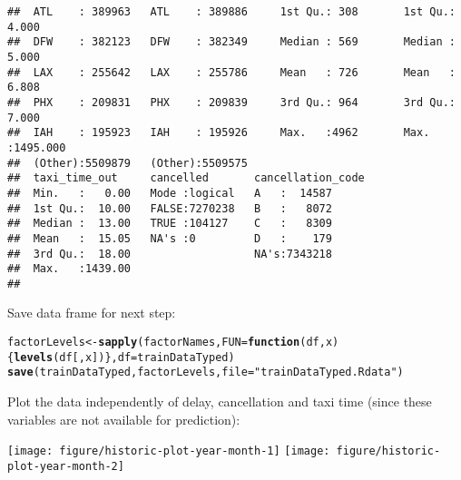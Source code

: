 \documentclass{article}\usepackage[]{graphicx}\usepackage[]{color}
\makeatletter
\newcommand{\hlstr}[1]{\textcolor[rgb]{0.192,0.494,0.8}{#1}}%
\newcommand{\hlstd}[1]{\textcolor[rgb]{0.345,0.345,0.345}{#1}}%
\newcommand{\hlkwa}[1]{\textcolor[rgb]{0.161,0.373,0.58}{\textbf{#1}}}%
\newcommand{\hlkwb}[1]{\textcolor[rgb]{0.69,0.353,0.396}{#1}}%
\newcommand{\hlkwc}[1]{\textcolor[rgb]{0.333,0.667,0.333}{#1}}%
\newcommand{\hlkwd}[1]{\textcolor[rgb]{0.737,0.353,0.396}{\textbf{#1}}}%
\newenvironment{kframe}{%
 \def\at@end@of@kframe{}%
 \ifinner\ifhmode%
  \def\at@end@of@kframe{\end{minipage}}%
  \begin{minipage}{\columnwidth}%
 \fi\fi%
 \def\FrameCommand##1{\hskip\@totalleftmargin \hskip-\fboxsep
 \colorbox{shadecolor}{##1}\hskip-\fboxsep
     \hskip-\linewidth \hskip-\@totalleftmargin \hskip\columnwidth}%
 \MakeFramed {\advance\hsize-\width
   \@totalleftmargin\z@ \linewidth\hsize
   \@setminipage}}%
 {\par\unskip\endMakeFramed%
 \at@end@of@kframe}
\newenvironment{knitrout}{}{} %
\makeatother
\begin{document}
\begin{knitrout}
\begin{kframe}
\begin{verbatim}
##  ATL    : 389963   ATL    : 389886     1st Qu.: 308       1st Qu.:   4.000  
##  DFW    : 382123   DFW    : 382349     Median : 569       Median :   5.000  
##  LAX    : 255642   LAX    : 255786     Mean   : 726       Mean   :   6.808  
##  PHX    : 209831   PHX    : 209839     3rd Qu.: 964       3rd Qu.:   7.000  
##  IAH    : 195923   IAH    : 195926     Max.   :4962       Max.   :1495.000  
##  (Other):5509879   (Other):5509575                                          
##  taxi_time_out     cancelled       cancellation_code
##  Min.   :   0.00   Mode :logical   A   :  14587     
##  1st Qu.:  10.00   FALSE:7270238   B   :   8072     
##  Median :  13.00   TRUE :104127    C   :   8309     
##  Mean   :  15.05   NA's :0         D   :    179     
##  3rd Qu.:  18.00                   NA's:7343218     
##  Max.   :1439.00                                    
## 
\end{verbatim}
\end{kframe}
\end{knitrout}

Save data frame for next step:
\begin{knitrout}
\color{fgcolor}\begin{kframe}
\begin{alltt}
\hlstd{factorLevels} \hlkwb{<-} \hlkwd{sapply}\hlstd{(factorNames,} \hlkwc{FUN}\hlstd{=}\hlkwa{function}\hlstd{(}\hlkwc{df}\hlstd{,} \hlkwc{x}\hlstd{) \{} \hlkwd{levels}\hlstd{(df[,x]) \},} \hlkwc{df}\hlstd{=trainDataTyped)}
\hlkwd{save}\hlstd{(trainDataTyped, factorLevels,} \hlkwc{file}\hlstd{=}\hlstr{"trainDataTyped.Rdata"}\hlstd{)}
\end{alltt}
\end{kframe}
\end{knitrout}




Plot the data independently of delay, cancellation and taxi time (since these variables are not available for prediction):
  


\begin{knitrout}
\color{fgcolor}

{\centering \texttt{[image: figure/historic-plot-year-month-1]} 
\texttt{[image: figure/historic-plot-year-month-2]} 

}



\end{knitrout}
\end{document}
